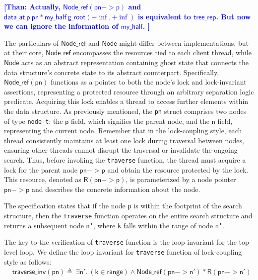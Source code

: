 \documentclass[a4paper,UKenglish,cleveref, autoref, thm-restate]{lipics-v2021}
\newcommand{\treerep}{\ensuremath{\mathsf{Node}}}
\newcommand{\nodeboxrep}{\ensuremath{\mathsf{Node\_ref}}}
\newcommand{\lockinv}{\ensuremath{\mathsf{lock\_inv}}}
\newcommand{\than}[1]{\textbf{\textcolor{blue}{[Than: #1]}}}
\begin{document}
\than{Actually, $\nodeboxrep \mathsf{(pn->p)}$ and $\mathsf{data\_at \ p \ pn} \ast \mathsf{my\_half \ g\_root} (-\inf, +\inf)$ is equivalent to $\mathsf{tree\_rep}$. But now we can ignore the information of $\mathsf{my\_half}$.  }
	
	 
The particulars of $\nodeboxrep$ and $\treerep$ might differ between implementations, but at their core, $\nodeboxrep$ encompasses the resources tied to each client thread, while $\treerep$ acts as an abstract representation containing ghost state that connects the data structure's concrete state to its abstract counterpart. Specifically, $\nodeboxrep(\mathsf{pn})$ functions as a pointer to both the node's lock and lock-invariant assertions, representing a protected resource through an arbitrary separation logic predicate. Acquiring this lock enables a thread to access further elements within the data structure. 
As previously mentioned, the \lstinline{pn} struct comprises two nodes of type \lstinline{node_t}: the $\mathsf{p}$ field, which signifies the parent node, and the $\mathsf{n}$ field, representing the current node. Remember that in the lock-coupling style, each thread consistently maintains at least one lock during traversal between nodes, ensuring other threads cannot disrupt the traversal or invalidate the ongoing search. Thus, before invoking the \texttt{traverse} function, the thread must acquire a lock for the parent node $\mathsf{pn->p}$ and obtain the resource protected by the lock. This resource, denoted as $\mathsf{R(pn->p)}$, is parameterized by a node pointer $\mathsf{pn->p}$ and describes the concrete information about the node.


The specification states that if the node \texttt{p} is within the footprint of the search structure, then the \texttt{traverse} function operates on the entire search structure and returns a subsequent node \texttt{n'}, where \texttt{k} falls within the range of node \texttt{n'}.

The key to the verification of \texttt{traverse} function is the loop invariant for the top-level loop. We define the loop invariant for \texttt{traverse} function of lock-coupling style as follows: 
\begin{align*} &\mathsf{traverse\_inv (pn)} \triangleq\ \exists \mathsf{n'}.\ (\mathsf{k} \in \mathsf{range})\land \nodeboxrep(\mathsf{pn->n'})  \ast  \mathsf{R(pn->n')}   
\end{align*}
\end{document}
